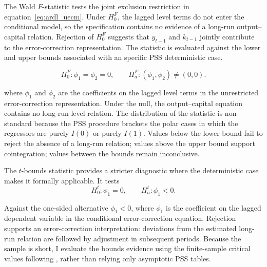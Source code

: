 \documentclass[11pt]{article}
\begin{document}
The Wald $F$-statistic tests the joint exclusion restriction in equation~\eqref{eq:ardl_uecm}. Under $H_{0}^{F}$, the lagged level terms do not enter the conditional model, so the specification contains no evidence of a long-run output--capital relation. Rejection of $H_{0}^{F}$ suggests that $y_{t-1}$ and $k_{t-1}$ jointly contribute to the error-correction representation. The statistic is evaluated against the lower and upper bounds associated with an specific PSS deterministic case.

\begin{equation}
H_{0}^{F}: \phi_1=\phi_2=0,
\qquad
H_{a}^{F}: (\phi_1,\phi_2)\neq(0,0).
\label{eq:fbounds_hypothesis}
\end{equation}

where $\phi_1$ and $\phi_2$ are the coefficients on the lagged level terms in the unrestricted error-correction representation. Under the null, the output--capital equation contains no long-run level relation. The distribution of the statistic is non-standard because the PSS procedure brackets the polar cases in which the regressors are purely $I(0)$ or purely $I(1)$. Values below the lower bound fail to reject the absence of a long-run relation; values above the upper bound support cointegration; values between the bounds remain inconclusive.

The $t$-bounds statistic provides a stricter diagnostic where the deterministic case makes it formally applicable. It tests
\begin{equation}
H_{0}^{t}: \phi_1=0,
\qquad
H_{a}^{t}: \phi_1<0.
\label{eq:tbounds_hypothesis}
\end{equation}

Against the one-sided alternative $\phi_1<0$, where $\phi_1$ is the coefficient on the lagged dependent variable in the conditional error-correction equation. Rejection supports an error-correction interpretation: deviations from the estimated long-run relation are followed by adjustment in subsequent periods. Because the sample is short, I evaluate the bounds evidence using the finite-sample critical values following \citet{NatsiopoulosTzeremes2022}, rather than relying only asymptotic PSS tables. 

\end{document}
